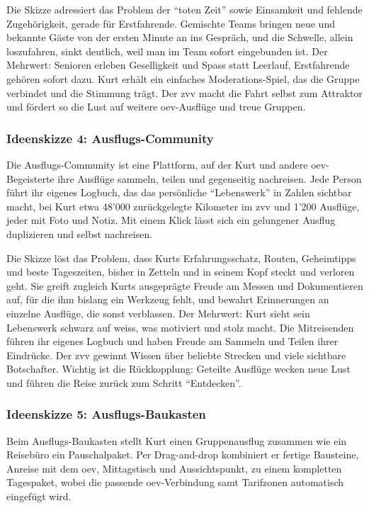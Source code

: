 Die Skizze adressiert das Problem der \enquote{toten Zeit} sowie Einsamkeit und fehlende Zugehörigkeit, gerade für Erstfahrende. Gemischte Teams bringen neue und bekannte Gäste von der ersten Minute an ins Gespräch, und die Schwelle, allein loszufahren, sinkt deutlich, weil man im Team sofort eingebunden ist. Der Mehrwert: Senioren erleben Geselligkeit und Spass statt Leerlauf, Erstfahrende gehören sofort dazu. Kurt erhält ein einfaches Moderations-Spiel, das die Gruppe verbindet und die Stimmung trägt. Der \gls{zvv} macht die Fahrt selbst zum Attraktor und fördert so die Lust auf weitere \gls{oev}-Ausflüge und treue Gruppen.

\subsubsection{Ideenskizze 4: Ausflugs-Community}
Die Ausflugs-Community ist eine Plattform, auf der Kurt und andere \gls{oev}-Begeisterte ihre Ausflüge sammeln, teilen und gegenseitig nachreisen. Jede Person führt ihr eigenes Logbuch, das das persönliche \enquote{Lebenswerk} in Zahlen sichtbar macht, bei Kurt etwa 48'000 zurückgelegte Kilometer im \gls{zvv} und 1'200 Ausflüge, jeder mit Foto und Notiz. Mit einem Klick lässt sich ein gelungener Ausflug duplizieren und selbst nachreisen.

Die Skizze löst das Problem, dass Kurts Erfahrungsschatz, Routen, Geheimtipps und beste Tageszeiten, bisher in Zetteln und in seinem Kopf steckt und verloren geht. Sie greift zugleich Kurts ausgeprägte Freude am Messen und Dokumentieren auf, für die ihm bislang ein Werkzeug fehlt, und bewahrt Erinnerungen an einzelne Ausflüge, die sonst verblassen. Der Mehrwert: Kurt sieht sein Lebenswerk schwarz auf weiss, was motiviert und stolz macht. Die Mitreisenden führen ihr eigenes Logbuch und haben Freude am Sammeln und Teilen ihrer Eindrücke. Der \gls{zvv} gewinnt Wissen über beliebte Strecken und viele sichtbare Botschafter. Wichtig ist die Rückkopplung: Geteilte Ausflüge wecken neue Lust und führen die Reise zurück zum Schritt \enquote{Entdecken}.

\subsubsection{Ideenskizze 5: Ausflugs-Baukasten}
Beim Ausflugs-Baukasten stellt Kurt einen Gruppenausflug zusammen wie ein Reisebüro ein Pauschalpaket. Per Drag-and-drop kombiniert er fertige Bausteine, Anreise mit dem \gls{oev}, Mittagstisch und Aussichtspunkt, zu einem kompletten Tagespaket, wobei die passende \gls{oev}-Verbindung samt Tarifzonen automatisch eingefügt wird.

